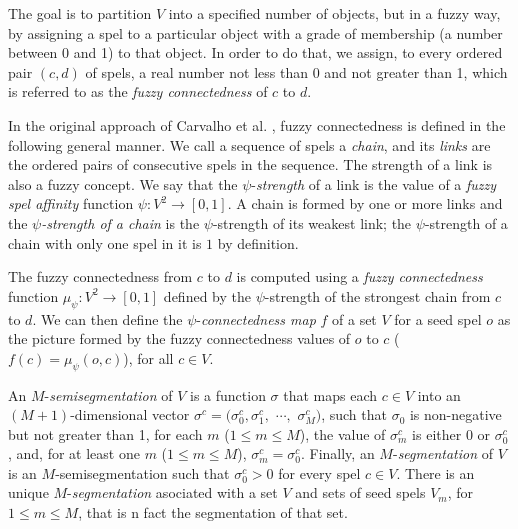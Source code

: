 \documentclass[10pt,twocolumn,letterpaper]{article}
\begin{document}
The goal is to partition $V$ into a specified number of objects, but in a fuzzy way, by assigning a spel to a particular object with a grade of membership (a number between 0 and 1) to that object. In order to do that, we assign, to every ordered pair $(c,d)$ of spels, a real number not less than 0 and not greater than 1, which is referred to as the \emph{fuzzy connectedness} of $c$ to $d$. 

In the original approach of Carvalho et al. \cite{CARV05a}, fuzzy connectedness is defined in the following general manner. We call a sequence of spels a \emph{chain}, and its \emph{links} are the ordered pairs of consecutive spels in the sequence. The strength of a link is also a fuzzy concept. We say that the $\psi$-\emph{strength} of a link is the value of a \emph{fuzzy spel affinity} function $\psi:V^{2}\rightarrow[0,1]$. A chain is formed by one or more links and the $\psi$\emph{-strength of a chain} is the $\psi$-strength of its weakest link; the $\psi$-strength of a chain with only one spel in it is $1$ by definition. %

The fuzzy connectedness from $c$ to $d$ is computed using a \emph{fuzzy connectedness} function $\mu_{\psi}:V^{2}\rightarrow[0,1]$ defined by  the $\psi$-strength of the strongest chain from $c$ to $d$. We can then define the $\psi$-\emph{connectedness map} $f$ of a set $V$ for a seed spel $o$ as the picture formed by the fuzzy connectedness values of $o$ to $c$ ($f(c)=\mu_{\psi}(o,c)$), for all $c\in V$. 

An $M$-\emph{semisegmentation} of $V$ is a function $\sigma$ that maps each $c\in V$ into an $(M+1)$-dimensional vector $\sigma ^{c}=(\sigma _{0}^{c},\sigma _{1}^{c},$ $\cdots ,$ $\sigma _{M}^{c})$, such that $\sigma _{0}$ is non-negative but not greater than 1, for each $m$ ($1\leq m\leq M$), the value of $\sigma _{m}^{c}$ is either 0 or $\sigma _{0}^{c}$, and, for at least one $m$ ($1\leq m\leq M$), $\sigma _{m}^{c}=\sigma _{0}^{c}$. Finally, an $M$-\emph{segmentation} of $V$ is an $M$-semisegmentation such that $\sigma_0^c > 0$ for every spel $c \in V$. There is an unique $M$-\emph{segmentation} asociated with a set $V$ and sets of seed spels $V_m$, for $1 \leq m \leq M$, that is n fact the segmentation of that set.
\end{document}
